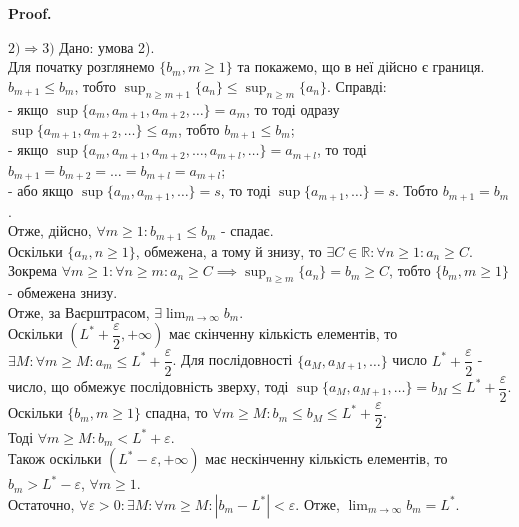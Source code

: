 \documentclass[a4paper, 14pt]{article}
\makeatletter
\def\qed{$\blacksquare$}
\theoremstyle{theoremdd}
\theoremstyle{theoremdd}
\theoremstyle{theoremdd}
\theoremstyle{theoremdd}
\theoremstyle{theoremdd}
\theoremstyle{theoremdd}
\theoremstyle{theoremdd}
\theoremstyle{theoremdd}
\renewenvironment{proof}[1][Proof.\\]{\par
\pushQED{\hfill \qed}%
\normalfont \topsep6\p@\@plus6\p@\relax
\trivlist
\item\relax
{\bfseries
#1\@addpunct{.}}\hspace\labelsep\ignorespaces
}{%
\popQED\endtrivlist\@endpefalse
}
\makeatother
\begin{document}
\begin{proof}
	$\boxed{2) \Rightarrow 3)}$ Дано: умова 2).\\
	Для початку розглянемо $\{b_m, m \geq 1\}$ та покажемо, що в неї дійсно є границя.\\
	$b_{m+1} \leq b_m$, тобто $\displaystyle \sup_{n \geq m+1} \{a_n\} \leq \sup_{n \geq m} \{a_n\}$. Справді:\\
	- якщо $\displaystyle \sup \{a_m, a_{m+1},a_{m+2},\dots\} = a_m$, то тоді одразу $\displaystyle \sup \{a_{m+1},a_{m+2},\dots\} \leq a_m$, тобто $b_{m+1} \leq b_m$;\\
	- якщо $\displaystyle \sup \{a_m, a_{m+1},a_{m+2},\dots, a_{m+l}, \dots\} = a_{m+l}$, то тоді $b_{m+1} = b_{m+2} = \dots = b_{m+l} = a_{m+l}$; \\
	- або якщо $\sup \{a_m,a_{m+1},\dots\} = s$, то тоді $\sup \{a_{m+1},\dots\} = s$. Тобто $b_{m+1} = b_m$.\\
	Отже, дійсно, $\forall m \geq 1: b_{m+1} \leq b_m$ - спадає.\\
	Оскільки $\{a_n, n \geq 1\}$, обмежена, а тому й знизу, то $\exists C \in \mathbb{R}: \forall n \geq 1: a_n \geq C$. Зокрема $\forall m \geq 1: \forall n \geq m: a_n \geq C \implies \displaystyle \sup_{n \geq m} \{a_n\} = b_m \geq C$, тобто $\{b_m, m \geq 1\}$ - обмежена знизу. \\
	Отже, за Ваєрштрасом, $\exists \displaystyle \lim_{m \to \infty} b_m$.\\
	Оскільки $\left( L^*+\dfrac{\varepsilon}{2}, + \infty \right)$ має скінченну кількість елементів, то $\exists M: \forall m \geq M: a_m \leq L^* + \dfrac{\varepsilon}{2}$. Для послідовності $\{a_M,a_{M+1},\dots\}$ число $L^*+ \dfrac{\varepsilon}{2}$ - число, що обмежує послідовність зверху, тоді $\sup \{a_M,a_{M+1},\dots\} = b_M \leq L^* + \dfrac{\varepsilon}{2}$. Оскільки $\{b_m, m \geq 1\}$ спадна, то $\forall m \geq M: b_m \leq b_M \leq L^* + \dfrac{\varepsilon}{2}$.\\
	Тоді $\forall m \geq M: b_m < L^* + \varepsilon$.\\
	Також оскільки $(L^*-\varepsilon, + \infty)$ має нескінченну кількість елементів, то $b_m > L^* - \varepsilon$, $\forall m \geq 1$.\\
	Остаточно, $\forall \varepsilon > 0: \exists M: \forall m \geq M: |b_m - L^*| < \varepsilon$. Отже, $\displaystyle \lim_{m \to \infty} b_m = L^*$.
	\bigskip \\
	

\end{proof}
\end{document}

